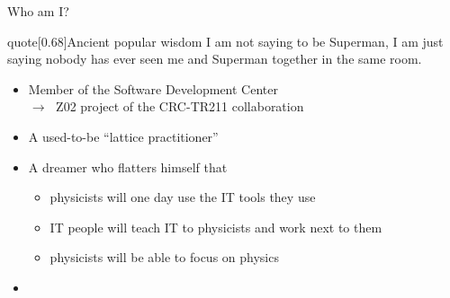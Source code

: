 \begin{frame}{Who am I?}
    \begin{varblock}{quote}[0.68\textwidth]{Ancient popular wisdom}
        \guillemotleft{}I am not saying to be Superman, I am just saying nobody has ever seen me and Superman together in the same room.\guillemotright
    \end{varblock}
    \vspace{5mm}
    \begin{itemize}
        \item Member of the Software Development Center \\ $\to\;$ Z02 project of the CRC-TR211 collaboration
        \item A used-to-be ``lattice practitioner''
        \item A dreamer who flatters himself that
              \begin{itemize}
                  \item physicists will one day  use the IT tools they use
                  \item IT people will teach IT to physicists and work next to them
                  \item physicists will be able to focus on physics
              \end{itemize}
        \item {}
    \end{itemize}
\end{frame}

